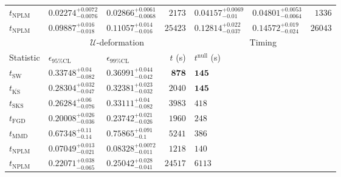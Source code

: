 \begin{tabular}{l|llr|llr}
\rowcolor{red!35}	$t_{\mathrm{NPLM}}$ & $0.02274_{-0.0076}^{+0.0072}$ & $0.02866_{-0.0068}^{+0.0061}$ & $2173$ & $0.04157_{-0.01}^{+0.0069}$ & $0.04801_{-0.0064}^{+0.0053}$ & $1336$ \\
\rowcolor{blue!35}	$t_{\mathrm{NPLM}}$ & $0.09887_{-0.018}^{+0.016}$ & $0.11057_{-0.016}^{+0.014}$ & $25423$ & $0.12814_{-0.037}^{+0.022}$ & $0.14572_{-0.024}^{+0.019}$ & $26043$ \\
	\toprule
	\multicolumn{1}{c}{} & \multicolumn{3}{c}{$\mathcal{U}$-deformation} & \multicolumn{3}{c}{Timing} \\
Statistic & $\epsilon_{95\%\mathrm{CL}}$ & $\epsilon_{99\%\mathrm{CL}}$ & $t$ (s) & $t^{\mathrm{null}}$ (s) \\
	\midrule
	$t_{\mathrm{SW}}$ & $0.33748_{-0.082}^{+0.04}$ & $0.36991_{-0.042}^{+0.044}$ & ${\mathbf{878}}$ & ${\mathbf{145}}$ \\
	$t_{\overline{\mathrm{KS}}}$ & $0.28304_{-0.047}^{+0.032}$ & $0.32381_{-0.032}^{+0.023}$ & $2040$ & ${\mathbf{145}}$ \\
	$t_{\mathrm{SKS}}$ & $0.26284_{-0.076}^{+0.06}$ & $0.33111_{-0.082}^{+0.04}$ & $3983$ & $418$ \\
	$t_{\mathrm{FGD}}$ & ${\mathbf{0.20008_{-0.036}^{+0.026}}}$ & ${\mathbf{0.23742_{-0.026}^{+0.021}}}$ & $1960$ & $248$ \\
	$t_{\mathrm{MMD}}$ & $0.67348_{-0.14}^{+0.11}$ & $0.75865_{-0.1}^{+0.091}$ & $5241$ & $386$ \\
\rowcolor{red!35}	$t_{\mathrm{NPLM}}$ & $0.07049_{-0.021}^{+0.013}$ & $0.08328_{-0.011}^{+0.0072}$ & $1218$ & $140$ \\
\rowcolor{blue!35}	$t_{\mathrm{NPLM}}$ & $0.22071_{-0.065}^{+0.038}$ & $0.25042_{-0.041}^{+0.028}$ & $24517$ & $6113$ \\
	\bottomrule
\end{tabular}